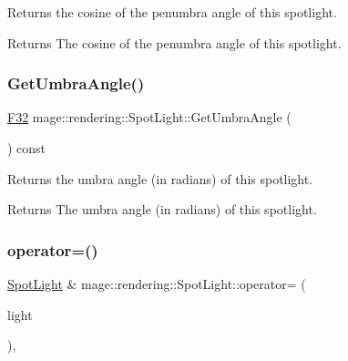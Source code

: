 Returns the cosine of the penumbra angle of this spotlight.

\begin{DoxyReturn}{Returns}
The cosine of the penumbra angle of this spotlight. 
\end{DoxyReturn}
\hypertarget{classmage_1_1rendering_1_1_spot_light_a2ad4020c60fcfd2fca7568fbefa601f0}{}\label{classmage_1_1rendering_1_1_spot_light_a2ad4020c60fcfd2fca7568fbefa601f0} 
\subsubsection{\texorpdfstring{Get\+Umbra\+Angle()}{GetUmbraAngle()}}
{\footnotesize\ttfamily \hyperlink{namespacemage_aa97e833b45f06d60a0a9c4fc22ae02c0}{F32} mage\+::rendering\+::\+Spot\+Light\+::\+Get\+Umbra\+Angle (\begin{DoxyParamCaption}{ }\end{DoxyParamCaption}) const\hspace{0.3cm}{\ttfamily [noexcept]}}

Returns the umbra angle (in radians) of this spotlight.

\begin{DoxyReturn}{Returns}
The umbra angle (in radians) of this spotlight. 
\end{DoxyReturn}
\hypertarget{classmage_1_1rendering_1_1_spot_light_a6bf91b086aa54f2e31d92ed401cf0fdc}{}\label{classmage_1_1rendering_1_1_spot_light_a6bf91b086aa54f2e31d92ed401cf0fdc} 
\subsubsection{\texorpdfstring{operator=()}{operator=()}\hspace{0.1cm}{\footnotesize\ttfamily [1/2]}}
{\footnotesize\ttfamily \hyperlink{classmage_1_1rendering_1_1_spot_light}{Spot\+Light} \& mage\+::rendering\+::\+Spot\+Light\+::operator= (\begin{DoxyParamCaption}\item[{const \hyperlink{classmage_1_1rendering_1_1_spot_light}{Spot\+Light} \&}]{light }\end{DoxyParamCaption})\hspace{0.3cm}{\ttfamily [default]}, {\ttfamily [noexcept]}}

